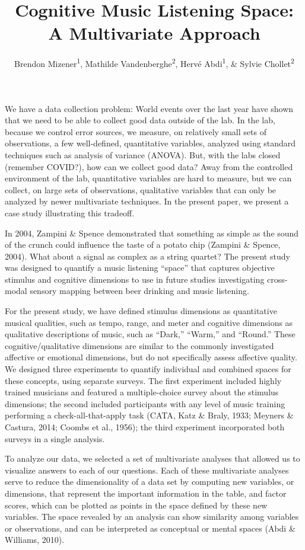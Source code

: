 \documentclass[
  english,
  man,floatsintext]{apa6}
\title{Cognitive Music Listening Space: A Multivariate Approach}
\author{Brendon Mizener\textsuperscript{1}, Mathilde Vandenberghe\textsuperscript{2}, Hervé Abdi\textsuperscript{1}, \& Sylvie Chollet\textsuperscript{2}}
\date{}
\affiliation{\vspace{0.5cm}\textsuperscript{1} University of Texas at Dallas\\\textsuperscript{2} Junia, Univ. Artois, Université de Liège, Univ. Littoral Côte d'Opale, UMRT 1158 BioEcoAgro, F-62000 Arras, France}
\begin{document}
\maketitle

We have a data collection problem: World events over the last year have shown that we need to be able to collect good data outside of the lab. In the lab, because we control error sources, we measure, on relatively small sets of observations, a few well-defined, quantitative variables, analyzed using standard techniques such as analysis of variance (ANOVA). But, with the labs closed (remember COVID?), how can we collect good data? Away from the controlled environment of the lab, quantitative variables are hard to measure, but we can collect, on large sets of observations, qualitative variables that can only be analyzed by newer multivariate techniques. In the present paper, we present a case study illustrating this tradeoff.

In 2004, Zampini \& Spence demonstrated that something as simple as the sound of the crunch could influence the taste of a potato chip (Zampini \& Spence, 2004). What about a signal as complex as a string quartet? The present study was designed to quantify a music listening ``space'' that captures objective stimulus and cognitive dimensions to use in future studies investigating cross-modal sensory mapping between beer drinking and music listening.

For the present study, we have defined stimulus dimensions as quantitative musical qualities, such as tempo, range, and meter and cognitive dimensions as qualitative descriptions of music, such as ``Dark,'' ``Warm,'' and ``Round.'' These cognitive/qualitative dimensions are similar to the commonly investigated affective or emotional dimensions, but do not specifically assess affective quality. We designed three experiments to quantify individual and combined spaces for these concepts, using separate surveys. The first experiment included highly trained musicians and featured a multiple-choice survey about the stimulus dimensions; the second included participants with any level of music training performing a check-all-that-apply task (CATA, Katz \& Braly, 1933; Meyners \& Castura, 2014; Coombs et al., 1956); the third experiment incorporated both surveys in a single analysis.

To analyze our data, we selected a set of multivariate analyses that allowed us to visualize answers to each of our questions. Each of these multivariate analyses serve to reduce the dimensionality of a data set by computing new variables, or dimensions, that represent the important information in the table, and factor scores, which can be plotted as points in the space defined by these new variables. The space revealed by an analysis can show similarity among variables or observations, and can be interpreted as conceptual or mental spaces (Abdi \& Williams, 2010).
\end{document}
